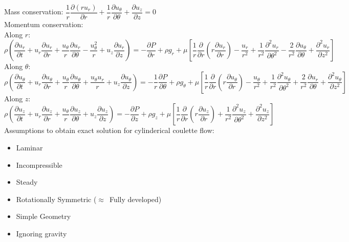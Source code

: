 \documentclass{article}
\begin{document}
\noindent Mass conservation: $\dfrac{1}{r} \dfrac{\partial (ru_r)}{\partial r} + \dfrac{1}{r} \dfrac{\partial u_\theta}{\partial \theta}+ \dfrac{\partial u_z}{\partial z}=0$\\
Momentum conservation: \\
Along $r$: $\rho (\dfrac{\partial u_r}{\partial t}+ u_r\dfrac{\partial u_r}{\partial r} + \dfrac{u_\theta}{r}\dfrac{\partial u_r}{\partial \theta} - \dfrac{u_\theta^2}{r}+ u_z\dfrac{\partial u_r}{\partial z}) = -\dfrac{\partial P}{\partial r}+ \rho g_r + \mu[\dfrac{1}{r}\dfrac{\partial}{\partial r}(r\dfrac{\partial u_r}{\partial r}) - \dfrac{u_r}{r^2} + \dfrac{1}{r^2}\dfrac{\partial^2 u_r}{\partial \theta^2} - \dfrac{2}{r^2}\dfrac{\partial u_\theta}{\partial \theta}+ \dfrac{\partial^2 u_r}{\partial z^2}]$\\

\noindent Along $\theta$: $\rho (\dfrac{\partial u_\theta}{\partial t}+ u_r\dfrac{\partial u_\theta}{\partial r} + \dfrac{u_\theta}{r}\dfrac{\partial u_\theta}{\partial \theta} + \dfrac{u_\theta u_r}{r}+ u_z\dfrac{\partial u_\theta}{\partial z}) = -\dfrac{1}{r}\dfrac{\partial P}{\partial \theta}+ \rho g_\theta + \mu[\dfrac{1}{r}\dfrac{\partial}{\partial r}(r\dfrac{\partial u_\theta}{\partial r}) - \dfrac{u_\theta}{r^2} + \dfrac{1}{r^2}\dfrac{\partial^2 u_\theta}{\partial \theta^2} + \dfrac{2}{r^2}\dfrac{\partial u_r}{\partial \theta}+ \dfrac{\partial^2 u_\theta}{\partial z^2}]$\\

\noindent Along $z$: $\rho (\dfrac{\partial u_z}{\partial t}+ u_r\dfrac{\partial u_z}{\partial r} + \dfrac{u_\theta}{r}\dfrac{\partial u_z}{\partial \theta} + u_z\dfrac{\partial u_z}{\partial z}) = -\dfrac{\partial P}{\partial z}+ \rho g_z + \mu[\dfrac{1}{r}\dfrac{\partial}{\partial r}(r\dfrac{\partial u_z}{\partial r}) + \dfrac{1}{r^2}\dfrac{\partial^2 u_z}{\partial \theta^2} + \dfrac{\partial^2 u_z}{\partial z^2}]$\\

\noindent Assumptions to obtain exact solution for cylinderical coulette flow: 
\begin{itemize}
    \item Laminar
    \item Incompressible
    \item Steady
    \item Rotationally Symmetric ($\approx$\ Fully developed)
    \item Simple Geometry
    \item Ignoring gravity
\end{itemize}
\end{document}
